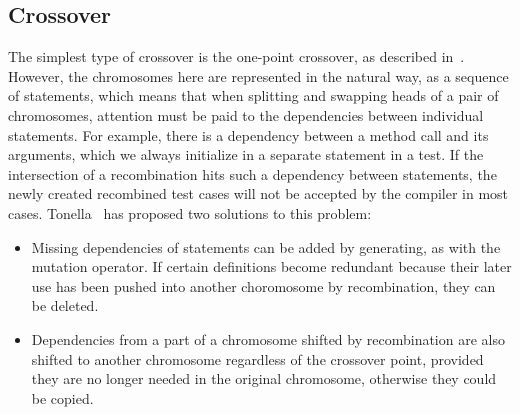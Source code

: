 \documentclass[paper=a4,%
  twoside,%
  BCOR4mm,%
  abstract=true,%
  toc=bibliography,%
  chapterprefix=true,%
  toc=bibliographynumbered,%
  open=right,%
  english,%
  pagesize=pdftex]{scrreprt}
\begin{document}
\subsection{Crossover}

The simplest type of crossover is the one-point crossover, as described in~. However, the chromosomes here are represented in the natural way, as a sequence of statements, which means that when splitting and swapping heads of a pair of chromosomes, attention must be paid to the dependencies between individual statements. For example, there is a dependency between a method call and its arguments, which we always initialize in a separate statement in a test. If the intersection of a recombination hits such a dependency between statements, the newly created recombined test cases will not be accepted by the compiler in most cases. Tonella~\cite{Tonella2004} has proposed two solutions to this problem:

\begin{itemize}
    \item Missing dependencies of statements can be added by generating, as with the mutation operator. If certain definitions become redundant because their later use has been pushed into another choromosome by recombination, they can be deleted.
    \item Dependencies from a part of a chromosome shifted by recombination are also shifted to another chromosome regardless of the crossover point, provided they are no longer needed in the original chromosome, otherwise they could be copied.
\end{itemize}
\end{document}
